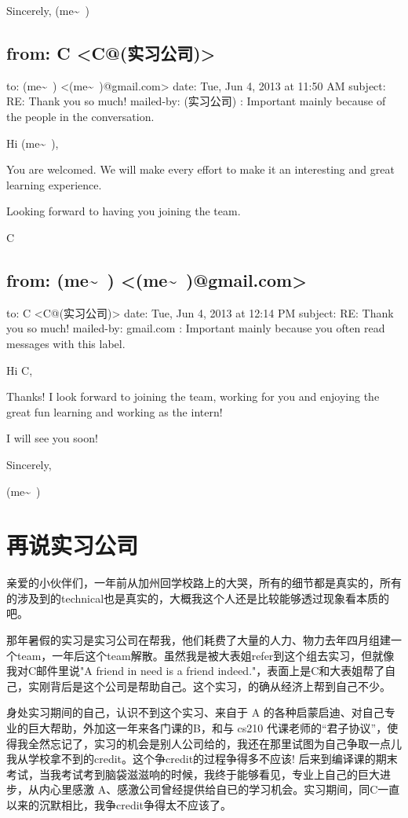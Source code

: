 \documentclass[12pt]{book}
\begin{document}
Sincerely,
(me\textasciitilde{}~)


\section{from:         C <C@(实习公司)>}
\label{sec-46-2}
to:         (me\textasciitilde{}~) <(me\textasciitilde{}~)@gmail.com>
date:         Tue, Jun 4, 2013 at 11:50 AM
subject:         RE: Thank you so much!
mailed-by:         (实习公司)
:         Important mainly because of the people in the conversation.

Hi (me\textasciitilde{}~),

You are welcomed. We will make every effort to make it an interesting and great learning experience.

Looking forward to having you joining the team.

C


\section{from:         (me\textasciitilde{}~) <(me\textasciitilde{}~)@gmail.com>}
\label{sec-46-3}
to:         C <C@(实习公司)>
date:         Tue, Jun 4, 2013 at 12:14 PM
subject:         RE: Thank you so much!
mailed-by:         gmail.com
:         Important mainly because you often read messages with this label.

Hi C,

Thanks! I look forward to joining the team, working for you and enjoying the great fun learning and working as the intern!

I will see you soon!

Sincerely,

(me\textasciitilde{}~)

\chapter{再说实习公司}
\label{sec-47}

亲爱的小伙伴们，一年前从加州回学校路上的大哭，所有的细节都是真实的，所有的涉及到的technical也是真实的，大概我这个人还是比较能够透过现象看本质的吧。

那年暑假的实习是实习公司在帮我，他们耗费了大量的人力、物力去年四月组建一个team，一年后这个team解散。虽然我是被大表姐refer到这个组去实习，但就像我对C邮件里说"A friend in need is a friend indeed."，表面上是C和大表姐帮了自己，实刚背后是这个公司是帮助自己。这个实习，的确从经济上帮到自己不少。

身处实习期间的自己，认识不到这个实习、来自于 A 的各种启蒙启迪、对自己专业的巨大帮助，外加这一年来各门课的B，和与 cs210 代课老师的“君子协议”，使得我全然忘记了，实习的机会是别人公司给的，我还在那里试图为自己争取一点儿我从学校拿不到的credit。这个争credit的过程争得多不应该! 后来到编译课的期末考试，当我考试考到脑袋滋滋响的时候，我终于能够看见，专业上自己的巨大进步，从内心里感激 A、感激公司曾经提供给自已的学习机会。实习期间，同C一直以来的沉默相比，我争credit争得太不应该了。
\end{document}

